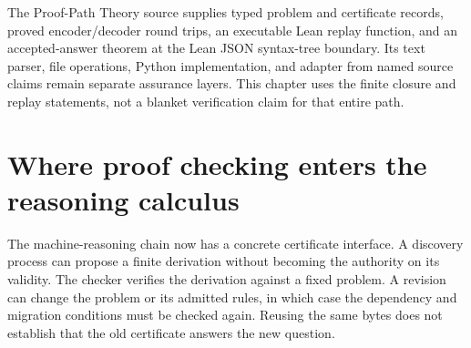 The Proof-Path Theory source supplies typed problem and certificate records, proved encoder/decoder round trips, an executable Lean replay function, and an accepted-answer theorem at the Lean JSON syntax-tree boundary. Its text parser, file operations, Python implementation, and adapter from named source claims remain separate assurance layers. This chapter uses the finite closure and replay statements, not a blanket verification claim for that entire path.


\section{Where proof checking enters the reasoning calculus}
The machine-reasoning chain now has a concrete certificate interface. A discovery process can propose a finite derivation without becoming the authority on its validity. The checker verifies the derivation against a fixed problem. A revision can change the problem or its admitted rules, in which case the dependency and migration conditions must be checked again. Reusing the same bytes does not establish that the old certificate answers the new question.
